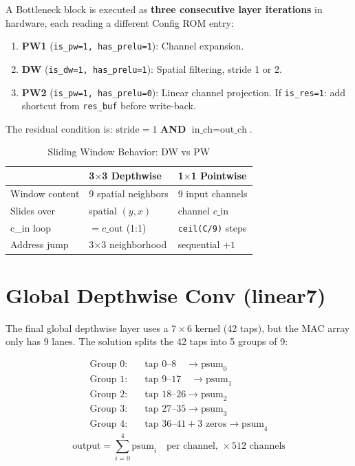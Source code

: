 A Bottleneck block is executed as \textbf{three consecutive layer iterations} in hardware, each reading a different Config ROM entry:
 
\begin{enumerate}[nosep]
  \item \textbf{PW1} (\texttt{is\_pw=1, has\_prelu=1}): Channel expansion.
  \item \textbf{DW} (\texttt{is\_dw=1, has\_prelu=1}): Spatial filtering, stride 1 or 2.
  \item \textbf{PW2} (\texttt{is\_pw=1, has\_prelu=0}): Linear channel projection. If \texttt{is\_res=1}: add shortcut from \texttt{res\_buf} before write-back.
\end{enumerate}
 
The residual condition is: $\text{stride}=1$ \textbf{AND} $\text{in\_ch}=\text{out\_ch}$.
 
\begin{table}[H]
\centering
\caption{Sliding Window Behavior: DW vs PW}
\begin{tabular}{lll}
\toprule
                      & \textbf{3$\times$3 Depthwise} & \textbf{1$\times$1 Pointwise} \\
\midrule
Window content        & 9 spatial neighbors     & 9 input channels \\
Slides over           & spatial $(y,x)$         & channel $c\_\text{in}$ \\
c\_in loop            & $= c\_\text{out}$ (1:1) & \texttt{ceil(C/9)} steps \\
Address jump          & 3$\times$3 neighborhood & sequential $+1$ \\
\bottomrule
\end{tabular}
\end{table}
 
\section{Global Depthwise Conv (linear7)}
 
The final global depthwise layer uses a $7\times6$ kernel (42 taps), but the MAC array only has 9 lanes. The solution splits the 42 taps into 5 groups of 9:
 
\begin{align*}
  \text{Group 0:} &\quad \text{tap } 0\text{--}8 \quad\rightarrow \text{psum}_0 \\
  \text{Group 1:} &\quad \text{tap } 9\text{--}17 \quad\rightarrow \text{psum}_1 \\
  \text{Group 2:} &\quad \text{tap } 18\text{--}26 \rightarrow \text{psum}_2 \\
  \text{Group 3:} &\quad \text{tap } 27\text{--}35 \rightarrow \text{psum}_3 \\
  \text{Group 4:} &\quad \text{tap } 36\text{--}41 + \text{3 zeros} \rightarrow \text{psum}_4
\end{align*}
\[
  \text{output} = \sum_{i=0}^{4} \text{psum}_i \quad \text{per channel, } \times 512 \text{ channels}
\]
 
